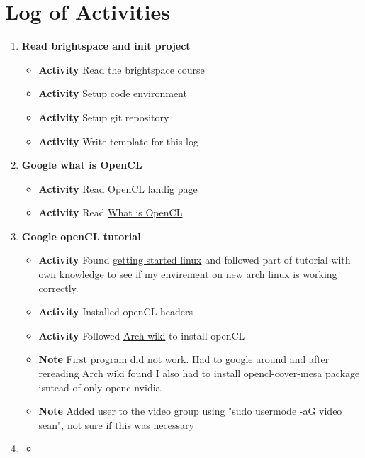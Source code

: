 \documentclass{article}
\begin{document}
\section*{Log of Activities}
\begin{enumerate}
    \item \textbf{Read brightspace and init project}
    \begin{itemize}
        \item \textbf{Activity} Read the brightspace course
        \item \textbf{Activity} Setup code environment
        \item \textbf{Activity} Setup git repository
        \item \textbf{Activity} Write template for this log
    \end{itemize}
    \item \textbf{Google what is OpenCL}
    \begin{itemize}
        \item \textbf{Activity} Read \href{https://www.khronos.org/api/index_2017/opencl/}{OpenCL landig page}
        \item \textbf{Activity} Read \href{https://medium.com/@bcrodrigues/what-is-opencl-14fbec353e09}{What is OpenCL}
    \end{itemize}
    \item \textbf{Google openCL tutorial}
    \begin{itemize}
        \item \textbf{Activity} Found \href{https://github.com/KhronosGroup/OpenCL-Guide/blob/main/chapters/getting_started_linux.md}{getting started linux} and followed part of tutorial with own knowledge to see if my envirement on new arch linux is working correctly.
        \item \textbf{Activity} Installed openCL headers
        \item \textbf{Activity} Followed \href{https://wiki.archlinux.org/title/GPGPU#OpenCL}{Arch wiki} to install openCL
        \item \textbf{Note} First program did not work. Had to google around and after rereading Arch wiki found I also had to install opencl-cover-mesa package isntead of only openc-nvidia.
        \item \textbf{Note} Added user to the video group using "sudo usermode -aG video sean", not sure if this was necessary
    \end{itemize}
    \item \textbf{}
    \begin{itemize}
        \item \textbf{}
    \end{itemize}
\end{enumerate}
\end{document}
